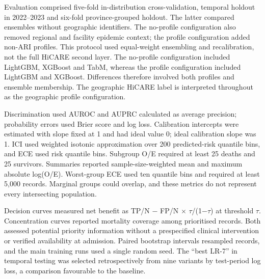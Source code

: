 \documentclass[11pt,a4paper]{article}
\begin{document}
Evaluation comprised five-fold in-distribution cross-validation, temporal holdout in 2022–2023 and six-fold province-grouped holdout. The latter compared ensembles without geographic identifiers. The no-profile configuration also removed regional and facility epidemic context; the profile configuration added non-ARI profiles. This protocol used equal-weight ensembling and recalibration, not the full HiCARE second layer. The no-profile configuration included LightGBM, XGBoost and TabM, whereas the profile configuration included LightGBM and XGBoost. Differences therefore involved both profiles and ensemble membership. The geographic HiCARE label is interpreted throughout as the geographic profile configuration.

Discrimination used AUROC and AUPRC calculated as average precision; probability errors used Brier score and log loss. Calibration intercepts were estimated with slope fixed at 1 and had ideal value 0; ideal calibration slope was 1. ICI used weighted isotonic approximation over 200 predicted-risk quantile bins, and ECE used risk quantile bins. Subgroup O/E required at least 25 deaths and 25 survivors. Summaries reported sample-size-weighted mean and maximum absolute log(O/E). Worst-group ECE used ten quantile bins and required at least 5,000 records. Marginal groups could overlap, and these metrics do not represent every intersecting population.

Decision curves measured net benefit as TP/N $-$ FP/N $\times$ $\tau$/(1$-$$\tau$) at threshold $\tau$. Concentration curves reported mortality coverage among prioritised records. Both assessed potential priority information without a prespecified clinical intervention or verified availability at admission. Paired bootstrap intervals resampled records, and the main training runs used a single random seed. The “best LR-7” in temporal testing was selected retrospectively from nine variants by test-period log loss, a comparison favourable to the baseline.
\end{document}

